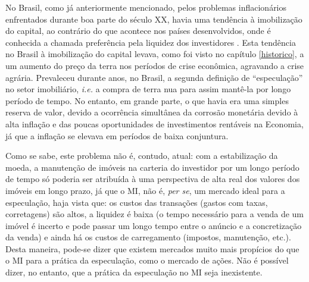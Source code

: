 \documentclass[
	12pt,				%
	oneside,			%
	a4paper,			%
	chapter=TITLE,		%
	section=TITLE,		%
	english,			%
	brazil				%
	]{abntex2}
\begin{document}
\begin{refsection}
No Brasil, como já anteriormente mencionado, pelos problemas inflacionários
enfrentados durante boa parte do século XX, havia uma tendência à imobilização
do capital, ao contrário do que acontece nos
países desenvolvidos, onde é conhecida a chamada preferência pela liquidez dos
investidores \autocite[546]{blanchard}. Esta tendência no Brasil à imobilização do
capital levava, como foi visto no capítulo \ref{historico}, a um aumento do
preço da terra nos períodos de crise econômica, agravando a crise agrária.
Prevaleceu durante anos, no Brasil, a segunda definição de ``especulação'' no
setor imobiliário, \emph{i.e.} a compra de terra nua para assim mantê-la por longo
período de tempo. No entanto, em grande parte, o que havia era uma simples
reserva de valor, devido a ocorrência simultânea da corrosão monetária devido à
alta inflação e das poucas oportunidades de investimentos rentáveis na Economia,
já que a inflação se elevava em períodos de baixa conjuntura.

Como se sabe, este problema não é, contudo, atual: com a estabilização da moeda,
a manutenção de imóveis na carteria do investidor por um longo período de tempo
só poderia ser atribuída à uma perspectiva de alta real dos valores dos imóveis
em longo prazo, já que o \gls{MI}, não é, \emph{per se}, um mercado ideal para a
especulação, haja vista que: os custos das transações (gastos com taxas,
corretagens) são altos, a liquidez é baixa (o tempo necessário para a venda de
um imóvel é incerto e pode passar um longo tempo entre o anúncio e a
concretização da venda) e ainda há os custos de carregamento (impostos,
manutenção, etc.). Desta maneira, pode-se dizer que existem mercados muito mais
propícios do que o \gls{MI} para a prática da especulação, como o mercado de
ações. Não é possível dizer, no entanto, que a prática da especulação no
\gls{MI} seja inexistente.


\end{refsection}
\end{document}
